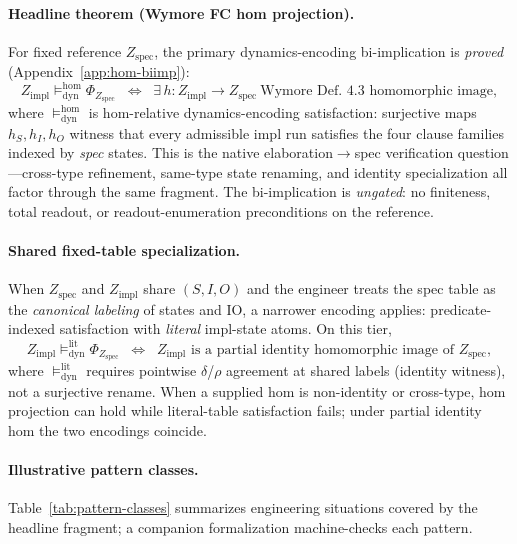 \paragraph{Headline theorem (Wymore FC hom projection).}
For fixed reference $Z_{\text{spec}}$, the primary dynamics-encoding bi-implication is \emph{proved} (Appendix~\ref{app:hom-biimp}):
\[
  Z_{\text{impl}} \models_{\mathrm{dyn}}^{\mathrm{hom}} \Phi_{Z_{\text{spec}}}
  \;\;\Longleftrightarrow\;\;
  \exists\, h : Z_{\text{impl}} \to Z_{\text{spec}}\ \text{Wymore Def.~4.3 homomorphic image},
\]
where $\models_{\mathrm{dyn}}^{\mathrm{hom}}$ is hom-relative dynamics-encoding satisfaction: surjective maps $h_S,h_I,h_O$ witness that every admissible impl run satisfies the four clause families indexed by \emph{spec} states. This is the native elaboration$\to$spec verification question---cross-type refinement, same-type state renaming, and identity specialization all factor through the same fragment. The bi-implication is \emph{ungated}: no finiteness, total readout, or readout-enumeration preconditions on the reference.

\paragraph{Shared fixed-table specialization.}
When $Z_{\text{spec}}$ and $Z_{\text{impl}}$ share $(S, I, O)$ and the engineer treats the spec table as the \emph{canonical labeling} of states and IO, a narrower encoding applies: predicate-indexed satisfaction with \emph{literal} impl-state atoms. On this tier,
\[
  Z_{\text{impl}} \models_{\mathrm{dyn}}^{\mathrm{lit}} \Phi_{Z_{\text{spec}}}
  \;\;\Longleftrightarrow\;\;
  Z_{\text{impl}} \text{ is a partial identity homomorphic image of } Z_{\text{spec}},
\]
where $\models_{\mathrm{dyn}}^{\mathrm{lit}}$ requires pointwise $\delta$/$\rho$ agreement at shared labels (identity witness), not a surjective rename. When a supplied hom is non-identity or cross-type, hom projection can hold while literal-table satisfaction fails; under partial identity hom the two encodings coincide.

\paragraph{Illustrative pattern classes.}
Table~\ref{tab:pattern-classes} summarizes engineering situations covered by the headline fragment; a companion formalization machine-checks each pattern.

